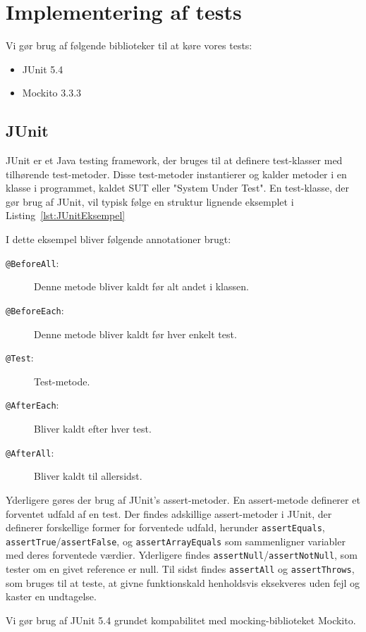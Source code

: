 \section{Implementering af tests}
Vi gør brug af følgende biblioteker til at køre vores tests:
\begin{itemize}
    \item JUnit 5.4
    \item Mockito 3.3.3
\end{itemize}

\subsection{JUnit}
JUnit\cite{JUnit} er et Java testing framework, der bruges til at definere test-klasser med tilhørende test-metoder. Disse test-metoder instantierer og kalder metoder i en klasse i programmet, kaldet SUT eller "System Under Test". En test-klasse, der gør brug af JUnit, vil typisk følge en struktur lignende eksemplet i Listing~\ref{lst:JUnitEksempel}

I dette eksempel bliver følgende annotationer brugt\cite{JUnitDocumentation}: 
\begin{description}
    \item[\texttt{@BeforeAll}:] Denne metode bliver kaldt før alt andet i klassen.
    \item[\texttt{@BeforeEach}:] Denne metode bliver kaldt før hver enkelt test.
    \item[\texttt{@Test}:] Test-metode.
    \item[\texttt{@AfterEach}:] Bliver kaldt efter hver test.
    \item[\texttt{@AfterAll}:] Bliver kaldt til allersidst.      
\end{description}

Yderligere gøres der brug af JUnit's assert-metoder. En assert-metode definerer et forventet udfald af en test. Der findes adskillige assert-metoder i JUnit, der definerer forskellige former for forventede udfald, herunder \texttt{assertEquals}, \texttt{assertTrue}/\texttt{assertFalse}, og \texttt{assertArrayEquals} som sammenligner variabler med deres forventede værdier. Yderligere findes \texttt{assertNull}/\texttt{assertNotNull}, som tester om en givet reference er null. Til sidst findes \texttt{assertAll} og \texttt{assertThrows}, som bruges til at teste, at givne funktionskald henholdsvis eksekveres uden fejl og kaster en undtagelse\cite{JUnitDocumentation}.

Vi gør brug af JUnit 5.4 grundet kompabilitet med mocking-biblioteket Mockito.

